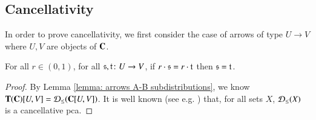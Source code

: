 \subsection{Cancellativity}\label{app:cancellativity}
In order to prove cancellativity, we first consider the case of arrows of type $U \to V$ where $U,V$ are objects of $\mathbf{C}$.
\begin{lemma}\label{lemma:cancellativity11}
For all $r\in (0,1)$, for all $\mathfrak{s},\mathfrak{t} \colon U \to V$, 
if $r\cdot \mathfrak{s} = r\cdot \mathfrak{t}$ then $\mathfrak{s} = \mathfrak{t}$.
\end{lemma}
\begin{proof}
By Lemma \ref{lemma: arrows A-B subdistributions}, we know $\mathbf{T}(\mathbf{C})[U,V]= \mathcal{D}_{\leq}(\mathbf{C}[U,V])$. It is well known (see e.g. \cite{sokolova2018termination}) that, for all sets $X$, $\mathcal{D}_{\leq}(X)$ is a cancellative pca.
\end{proof}

